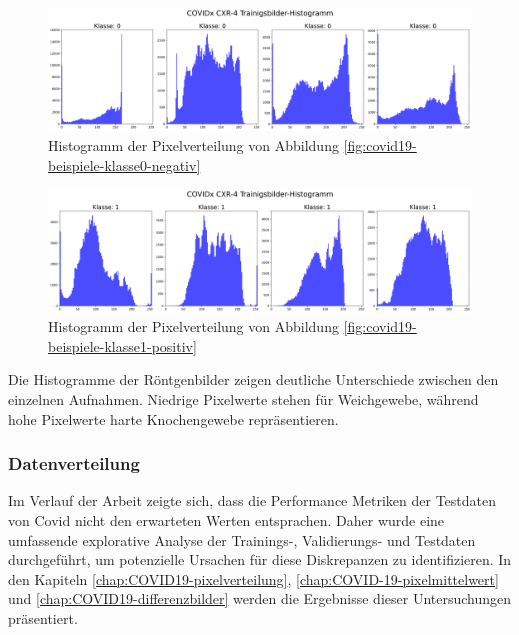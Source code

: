 \begin{figure}[H]
    \centering
    \includegraphics[width=\linewidth]{01-images/03-data/covid19-klasse0-hist.png}
    \caption{Histogramm der Pixelverteilung von Abbildung \ref{fig:covid19-beispiele-klasse0-negativ}}
    \label{fig:covid19-klasse0-hist}
\end{figure}

\begin{figure}[H]
    \centering
    \includegraphics[width=\linewidth]{01-images/03-data/covid19-klasse1-hist.png}
    \caption{Histogramm der Pixelverteilung von Abbildung \ref{fig:covid19-beispiele-klasse1-positiv}}
    \label{fig:covid19-klasse1-hist}
\end{figure}

Die Histogramme der Röntgenbilder zeigen deutliche Unterschiede zwischen den einzelnen Aufnahmen. Niedrige Pixelwerte stehen für Weichgewebe, während hohe Pixelwerte harte Knochengewebe repräsentieren.

\subsubsection{Datenverteilung} \label{chap:COVID19-datenverteilung}
Im Verlauf der Arbeit zeigte sich, dass die Performance Metriken der Testdaten von Covid nicht den erwarteten Werten entsprachen. Daher wurde eine umfassende explorative Analyse der Trainings-, Validierungs- und Testdaten durchgeführt, um potenzielle Ursachen für diese Diskrepanzen zu identifizieren. In den Kapiteln  \ref{chap:COVID19-pixelverteilung}, \ref{chap:COVID-19-pixelmittelwert} und \ref{chap:COVID19-differenzbilder} werden die Ergebnisse dieser Untersuchungen präsentiert.

